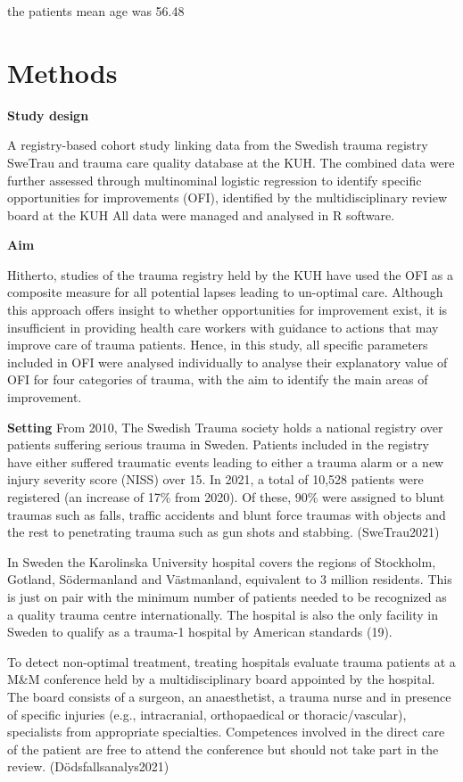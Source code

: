 \documentclass[
]{article}
\begin{document}
the patients mean age was 56.48

\hypertarget{methods}{%
\section{Methods}\label{methods}}

\textbf{Study design}

A registry-based cohort study linking data from the Swedish trauma
registry SweTrau and trauma care quality database at the KUH. The
combined data were further assessed through multinominal logistic
regression to identify specific opportunities for improvements (OFI),
identified by the multidisciplinary review board at the KUH All data
were managed and analysed in R software.

\textbf{Aim}

Hitherto, studies of the trauma registry held by the KUH have used the
OFI as a composite measure for all potential lapses leading to
un-optimal care. Although this approach offers insight to whether
opportunities for improvement exist, it is insufficient in providing
health care workers with guidance to actions that may improve care of
trauma patients. Hence, in this study, all specific parameters included
in OFI were analysed individually to analyse their explanatory value of
OFI for four categories of trauma, with the aim to identify the main
areas of improvement.

\textbf{Setting} From 2010, The Swedish Trauma society holds a national
registry over patients suffering serious trauma in Sweden. Patients
included in the registry have either suffered traumatic events leading
to either a trauma alarm or a new injury severity score (NISS) over 15.
In 2021, a total of 10,528 patients were registered (an increase of 17\%
from 2020). Of these, 90\% were assigned to blunt traumas such as falls,
traffic accidents and blunt force traumas with objects and the rest to
penetrating trauma such as gun shots and stabbing. (SweTrau2021)

In Sweden the Karolinska University hospital covers the regions of
Stockholm, Gotland, Södermanland and Västmanland, equivalent to 3
million residents. This is just on pair with the minimum number of
patients needed to be recognized as a quality trauma centre
internationally. The hospital is also the only facility in Sweden to
qualify as a trauma-1 hospital by American standards (19).

To detect non-optimal treatment, treating hospitals evaluate trauma
patients at a M\&M conference held by a multidisciplinary board
appointed by the hospital. The board consists of a surgeon, an
anaesthetist, a trauma nurse and in presence of specific injuries (e.g.,
intracranial, orthopaedical or thoracic/vascular), specialists from
appropriate specialties. Competences involved in the direct care of the
patient are free to attend the conference but should not take part in
the review. (Dödsfallsanalys2021)
\end{document}
